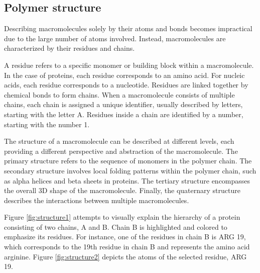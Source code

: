 \documentclass[
  digital,     %
  oneside,     %
  nosansbold,  %
  nocolorbold, %
  lof,         %
  lot,         %
]{fithesis4}
\begin{document}
\subsection{Polymer structure}
\label{section:polymer_structure}


Describing macromolecules solely by their atoms and bonds becomes impractical due to the large number of atoms involved. Instead, macromolecules are characterized by their residues and chains.

A residue refers to a specific monomer or building block within a macromolecule. In the case of proteins, each residue corresponds to an amino acid. For nucleic acids, each residue corresponds to a nucleotide. Residues are linked together by chemical bonds to form chains. When a macromolecule consists of multiple chains, each chain is assigned a unique identifier, usually described by letters, starting with the letter A. Residues inside a chain are identified by a number, starting with the number 1.

The structure of a macromolecule can be described at different levels, each providing a different perspective and abstraction of the macromolecule. The primary structure refers to the sequence of monomers in the polymer chain. The secondary structure involves local folding patterns within the polymer chain, such as alpha helices and beta sheets in proteins. The tertiary structure encompasses the overall 3D shape of the macromolecule. Finally, the quaternary structure describes the interactions between multiple macromolecules. \cite{pdb101_hierarchical}


Figure \ref{fig:structure1} attempts to visually explain the hierarchy of a protein consisting of two chains, A and B. Chain B is highlighted and colored to emphasize its residues. For instance, one of the residues in chain B is ARG 19, which corresponds to the 19th residue in chain B and represents the amino acid arginine. Figure \ref{fig:structure2} depicts the atoms of the selected residue, ARG 19.
\end{document}
